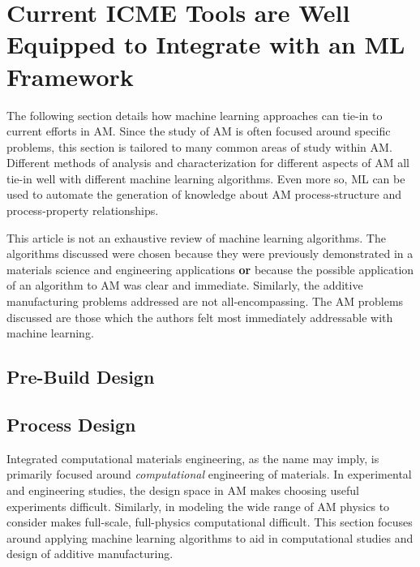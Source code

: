 \section{Current ICME Tools are Well Equipped to Integrate with an ML Framework}
The following section details how machine learning approaches can tie-in to current efforts in AM. Since the study of AM is often focused around specific problems, this section is tailored to many common areas of study within AM. Different methods of analysis and characterization for different aspects of AM all tie-in well with different machine learning algorithms. Even more so, ML can be used to automate the generation of knowledge about AM process-structure and process-property relationships. 

This article is not an exhaustive review of machine learning algorithms. The algorithms discussed were chosen because they were previously demonstrated in a materials science and engineering applications \textbf{or} because the possible application of an algorithm to AM was clear and immediate. Similarly, the additive manufacturing problems addressed are not all-encompassing. The AM problems discussed are those which the authors felt most immediately addressable with machine learning. 

\subsection{Pre-Build Design}




\subsection{Process Design}
Integrated computational materials engineering, as the name may imply, is primarily focused around \textit{computational} engineering of materials. In experimental and engineering studies, the design space in AM makes choosing useful experiments difficult. Similarly, in modeling the wide range of AM physics to consider makes full-scale, full-physics computational difficult. This section focuses around applying machine learning algorithms to aid in computational studies and design of additive manufacturing. 




